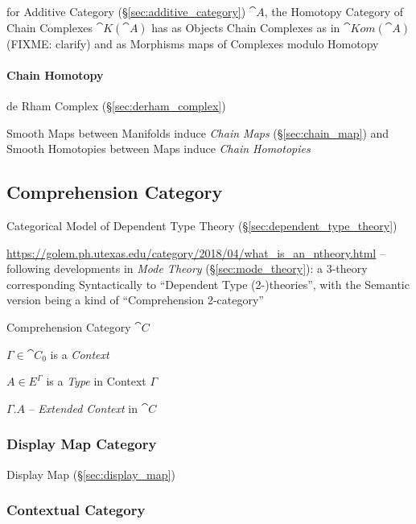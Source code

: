 for Additive Category (\S\ref{sec:additive_category}) $\cat{A}$, the Homotopy
Category of Chain Complexes $\cat{K}(\cat{A})$ has as Objects Chain Complexes as
in $\cat{Kom}(\cat{A})$ (FIXME: clarify) and as Morphisms maps of Complexes
modulo Homotopy



\paragraph{Chain Homotopy}\label{sec:chain_homotopy}\hfill

de Rham Complex (\S\ref{sec:derham_complex})

Smooth Maps between Manifolds induce \emph{Chain Maps} (\S\ref{sec:chain_map})
and Smooth Homotopies between Maps induce \emph{Chain Homotopies}



\subsection{Comprehension Category}\label{sec:comprehension_category}

Categorical Model of Dependent Type Theory (\S\ref{sec:dependent_type_theory})

\url{https://golem.ph.utexas.edu/category/2018/04/what_is_an_ntheory.html} --
following developments in \emph{Mode Theory} (\S\ref{sec:mode_theory}): a
$3$-theory corresponding Syntactically to ``Dependent Type (2-)theories'', with
the Semantic version being a kind of ``Comprehension 2-category''

Comprehension Category $\cat{C}$

$\Gamma \in \cat{C}_0$ is a \emph{Context}

$A \in E^\Gamma$ is a \emph{Type} in Context $\Gamma$

$\Gamma.A$ -- \emph{Extended Context} in $\cat{C}$



\subsubsection{Display Map Category}\label{sec:display_map_category}

Display Map (\S\ref{sec:display_map})



\subsubsection{Contextual Category}\label{sec:contextual_category}

